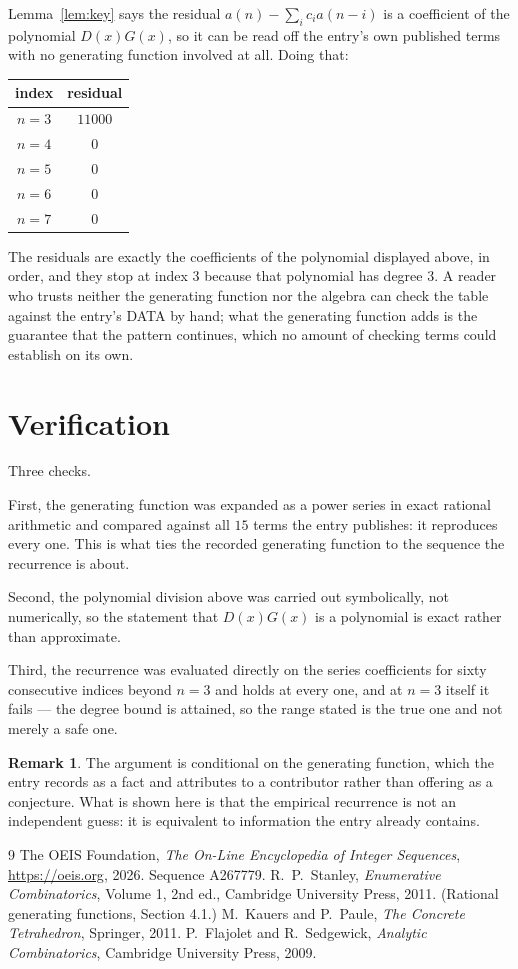 \documentclass[11pt,a4paper]{article}
\theoremstyle{plain}
\theoremstyle{definition}
\newtheorem{remark}[theorem]{Remark}
\begin{document}
Lemma~\ref{lem:key} says the residual $a(n)-\sum_ic_ia(n-i)$ is a coefficient of the
polynomial $D(x)G(x)$, so it can be read off the entry's own published terms with no
generating function involved at all. Doing that:
\begin{center}
\begin{tabular}{cc}
index & residual \\ \hline
$n=3$ & $11000$ \\
$n=4$ & $0$ \\
$n=5$ & $0$ \\
$n=6$ & $0$ \\
$n=7$ & $0$
\end{tabular}
\end{center}
The residuals are exactly the coefficients of the polynomial displayed above, in order, and
they stop at index $3$ because that polynomial has degree $3$. A reader who trusts
neither the generating function nor the algebra can check the table against the entry's DATA
by hand; what the generating function adds is the guarantee that the pattern continues, which
no amount of checking terms could establish on its own.

\section{Verification}

Three checks.

First, the generating function was expanded as a power series in exact rational arithmetic and
compared against all $15$ terms the entry publishes: it reproduces every one. This is
what ties the recorded generating function to the sequence the recurrence is about.

Second, the polynomial division above was carried out symbolically, not numerically, so the
statement that $D(x)G(x)$ is a polynomial is exact rather than approximate.

Third, the recurrence was evaluated directly on the series coefficients for sixty consecutive
indices beyond $n=3$ and holds at every one, and at $n=3$ itself it fails --- the
degree bound is attained, so the range stated is the true one and not merely a safe one.

\begin{remark}
The argument is conditional on the generating function, which the entry records as a fact and
attributes to a contributor rather than offering as a conjecture. What is shown here is that
the empirical recurrence is not an independent guess: it is equivalent to information the
entry already contains.
\end{remark}

\begin{thebibliography}{9}
 The OEIS Foundation, \emph{The On-Line Encyclopedia of Integer
Sequences}, \url{https://oeis.org}, 2026. Sequence A267779.
 R.~P.~Stanley, \emph{Enumerative Combinatorics}, Volume 1, 2nd ed.,
Cambridge University Press, 2011. (Rational generating functions, Section 4.1.)
 M.~Kauers and P.~Paule, \emph{The Concrete Tetrahedron}, Springer, 2011.
 P.~Flajolet and R.~Sedgewick, \emph{Analytic Combinatorics}, Cambridge
University Press, 2009.
\end{thebibliography}
\end{document}

